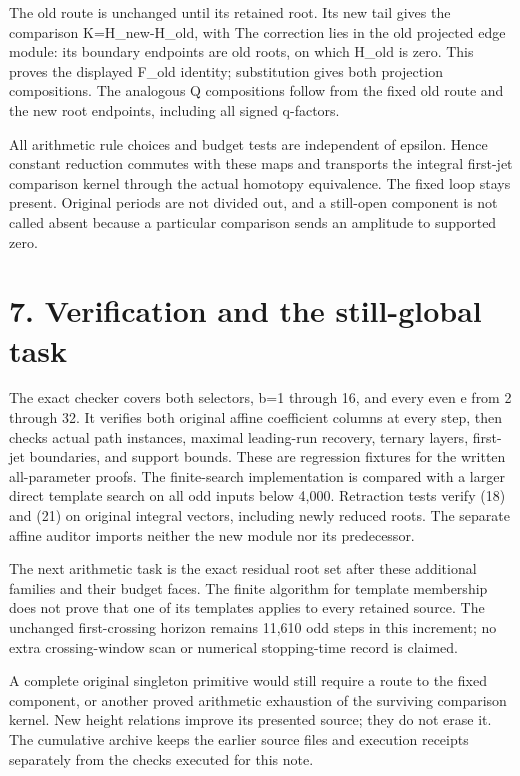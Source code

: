 The old route is unchanged until its retained root. Its new tail gives
the comparison K=H\_new-H\_old, with
 The correction lies in
the old projected edge module: its boundary endpoints are old roots, on
which H\_old is zero. This proves the displayed F\_old identity;
substitution gives both projection compositions. The analogous Q
compositions follow from the fixed old route and the new root endpoints,
including all signed q-factors.

All arithmetic rule choices and budget tests are independent of epsilon.
Hence constant reduction commutes with these maps and transports the
integral first-jet comparison kernel through the actual homotopy
equivalence. The fixed loop stays present. Original periods are not
divided out, and a still-open component is not called absent because a
particular comparison sends an amplitude to supported zero.

\section{7. Verification and the still-global task}

The exact checker covers both selectors, b=1 through 16, and every even
e from 2 through 32. It verifies both original affine coefficient
columns at every step, then checks actual path instances, maximal
leading-run recovery, ternary layers, first-jet boundaries, and support
bounds. These are regression fixtures for the written all-parameter
proofs. The finite-search implementation is compared with a larger
direct template search on all odd inputs below 4,000. Retraction tests
verify (18) and (21) on original integral vectors, including newly
reduced roots. The separate affine auditor imports neither the new
module nor its predecessor.

The next arithmetic task is the exact residual root set after these
additional families and their budget faces. The finite algorithm for
template membership does not prove that one of its templates applies to
every retained source. The unchanged first-crossing horizon remains
11,610 odd steps in this increment; no extra crossing-window scan or
numerical stopping-time record is claimed.

A complete original singleton primitive would still require a route to
the fixed component, or another proved arithmetic exhaustion of the
surviving comparison kernel. New height relations improve its presented
source; they do not erase it. The cumulative archive keeps the earlier
source files and execution receipts separately from the checks executed
for this note.

